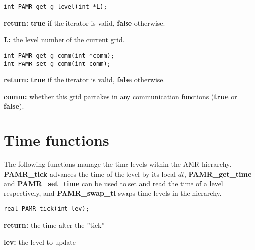 \documentclass[aps,amssymb,unsortedaddress,nofootinbib]{revtex4}
\def\lsep{\itemsep 0.05in}
\begin{document}

\begin{verbatim}
int PAMR_get_g_level(int *L);
\end{verbatim}
\begin{list}{}{\lsep}
\item {\bf return:} {\bf true} if the iterator is valid, {\bf false} otherwise.
\item {\bf *L:} the level number of the current grid.
\end{list}


\begin{verbatim}
int PAMR_get_g_comm(int *comm);
int PAMR_set_g_comm(int comm);
\end{verbatim}
\begin{list}{}{\lsep}
\item {\bf return:} {\bf true} if the iterator is valid, {\bf false} otherwise.
\item {\bf *comm:} whether this grid partakes in any communication functions
                   ({\bf true} or {\bf false}).
\end{list}


\section{Time functions}

The following functions manage the time levels within the AMR hierarchy.
{\bf PAMR\_tick} advances the time of the level by its local $dt$, 
{\bf PAMR\_get\_time} and {\bf PAMR\_set\_time} can be used to set and read
the time of a level respectively, and {\bf PAMR\_swap\_tl} swaps time levels 
in the hierarchy.


\begin{verbatim}
real PAMR_tick(int lev);
\end{verbatim}
\begin{list}{}{\lsep}
\item {\bf return:} the time after the ''tick''
\item {\bf lev:} the level to update
\end{list}
\end{document}
